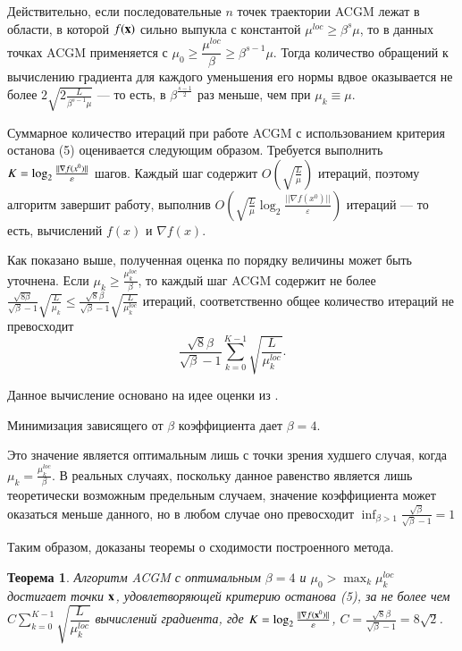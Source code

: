 \documentclass{crm-article}
\newtheorem{theorems}{Теорема}
\begin{document}
Действительно, если последовательные $n$ точек траектории ACGM лежат в области, в которой $f({\bf x})$ сильно выпукла с константой $\mu^{loc}\geq \beta^s\mu$, то в данных точках ACGM применяется с $\mu_0\geq \dfrac{\mu^{loc}}{\beta}\geq \beta^{s-1}\mu$. Тогда количество обращений к вычислению градиента для каждого уменьшения его нормы вдвое оказывается не более $2\sqrt{2\frac{L}{\beta^{s-1}\mu}}$ --- то есть, в $\beta^{\frac{s-1}{2}}$ раз меньше, чем при $\mu_k\equiv\mu$.

Суммарное количество итераций при работе ACGM с использованием критерия останова (5) оценивается следующим образом. Требуется выполнить $\\ K=\log_2\frac{||\nabla f(x^0)||}{\varepsilon}$ шагов. Каждый шаг содержит $O\left(\sqrt{\frac{L}{\mu}}\right)$ итераций, поэтому алгоритм завершит работу, выполнив $O\left(\sqrt{\frac{L}{\mu}}\log_2\frac{||\nabla f(x^0)||}{\varepsilon}\right)$ итераций --- то есть, вычислений $f(x)$ и $\nabla f(x)$.

Как показано выше, полученная оценка по порядку величины может быть уточнена. Если $\mu_k \geq \frac{\mu_k^{loc}}{\beta}$, то каждый шаг ACGM содержит не более $\frac{\sqrt{8\beta}}{\sqrt{\beta}-1}\sqrt{\frac{L}{\mu_k}}\leq \frac{\sqrt{8}\beta}{\sqrt{\beta}-1}\sqrt{\frac{L}{\mu_k^{loc}}}$ итераций, соответственно общее количество итераций не превосходит
$$\frac{\sqrt{8}\beta}{\sqrt{\beta}-1}\sum\limits_{k=0}^{K-1} \sqrt{\frac{L}{\mu_k^{loc}}}.$$

Данное вычисление основано на идее оценки из \cite{gasnikov2018entropy}.

Минимизация зависящего от $\beta$ коэффициента дает $\beta=4$.

Это значение является оптимальным лишь с точки зрения худшего случая, когда $\mu_k=\frac{\mu_k^{loc}}{\beta}$. В реальных случаях, поскольку данное равенство является лишь теоретически возможным предельным случаем, значение коэффициента может оказаться меньше данного, но в любом случае оно превосходит $\inf_{\beta>1}\frac{\sqrt{\beta}}{\sqrt{\beta}-1}=1$

Таким образом, доказаны теоремы о сходимости построенного метода.

\begin{theorems}
Алгоритм ACGM с оптимальным $\beta=4$ и $\mu_0>\max_k \mu_k^{loc}$ достигает точки ${\bf x}$, удовлетворяющей критерию останова (5), за не более чем $C\sum\limits_{k=0}^{K-1} \sqrt{\dfrac{L}{\mu_k^{loc}}}$ вычислений градиента, где $K=\log_2\frac{||\nabla f({\bf x}^0)||}{\varepsilon}$, $C=\frac{\sqrt{8}\beta}{\sqrt{\beta}-1}=8\sqrt{2}$.
\end{theorems}
\end{document}
